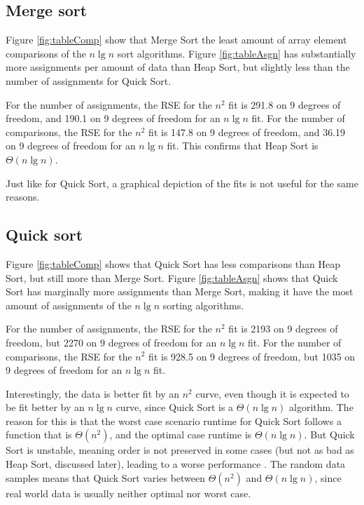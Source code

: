 \documentclass[10pt,fleqn]{article}
\begin{document}
\subsection{Merge sort}

Figure \ref{fig:tableComp} show that Merge Sort the least amount of array element comparisons of the $n\lg n$ sort algorithms. Figure \ref{fig:tableAsgn} has substantially more assignments per amount of data than Heap Sort, but slightly less than the number of assignments for Quick Sort. 

For the number of assignments, the RSE for the $n^2$ fit is 291.8 on 9 degrees of freedom, and 190.1 on 9 degrees of freedom for an $n\lg n$ fit. For the number of comparisons, the RSE for the $n^2$ fit is 147.8 on 9 degrees of freedom, and 36.19 on 9 degrees of freedom for an $n \lg n$ fit. This confirms that Heap Sort is $\Theta(n\lg n)$.

Just like for Quick Sort, a graphical depiction of the fits is not useful for the same reasons.

\subsection{Quick sort}

Figure \ref{fig:tableComp} shows that Quick Sort has less comparisons than Heap Sort, but still more than Merge Sort. Figure \ref{fig:tableAsgn} shows that Quick Sort has marginally more assignments than Merge Sort, making it have the most amount of assignments of the $n\lg n$ sorting algorithms.

For the number of assignments, the RSE for the $n^2$ fit is 2193 on 9 degrees of freedom, but 2270 on 9 degrees of freedom for an $n\lg n$ fit. For the number of comparisons, the RSE for the $n^2$ fit is 928.5 on 9 degrees of freedom, but 1035 on 9 degrees of freedom for an $n \lg n$ fit.

Interestingly, the data is better fit by an $n^2$ curve, even though it is expected to be fit better by an $n\lg n$ curve, since Quick Sort is a $\Theta(n\lg n)$ algorithm. The reason for this is that the worst case scenario runtime for Quick Sort follows a function that is $\Theta(n^2)$, and the optimal case runtime is $\Theta(n\lg n)$. But Quick Sort is unstable, meaning order is not preserved in some cases (but not as bad as Heap Sort, discussed later), leading to a worse performance \cite{Musser1997IntrospectiveSA}. The random data samples means that Quick Sort varies between $\Theta(n^2)$ and $\Theta(n\lg n)$, since real world data is usually neither optimal nor worst case.
\end{document}
